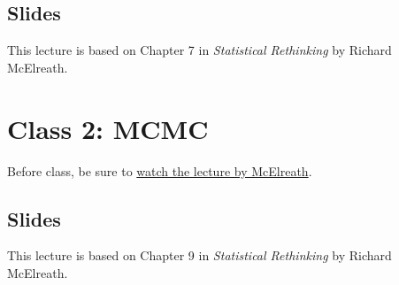 \documentclass[
]{book}
\begin{document}
\subsection{Slides}\label{slides-5}

This lecture is based on Chapter 7 in \emph{Statistical Rethinking} by Richard McElreath.

\section{Class 2: MCMC}\label{class-2-mcmc}

Before class, be sure to \href{https://www.youtube.com/watch?v=F0N4b7K_iYQ&list=PLDcUM9US4XdPz-KxHM4XHt7uUVGWWVSus&index=8}{watch the lecture by McElreath}.

\subsection{Slides}\label{slides-6}

This lecture is based on Chapter 9 in \emph{Statistical Rethinking} by Richard McElreath.


\end{document}
